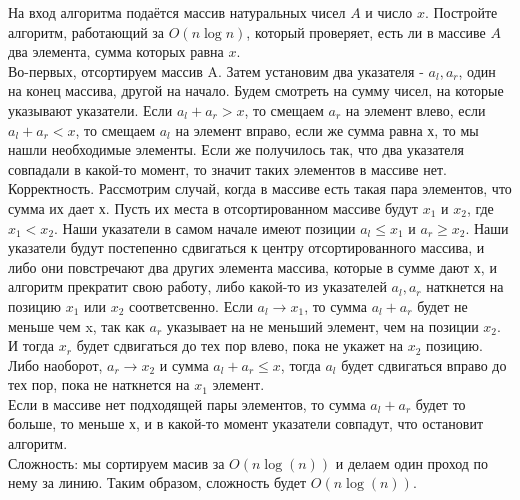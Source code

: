 \documentclass[12pt]{extreport}
\theoremstyle{definiton}
\theoremstyle{definition}
\theoremstyle{definition}
\let\leq\leqslant
\let\geq\geqslant
\begin{document}
\Pr[5] На вход алгоритма подаётся  массив натуральных чисел $A$ и число $x$. Постройте алгоритм, работающий за $O(n\log n)$, который проверяет, есть ли в массиве $A$ два элемента, сумма которых равна $x$.
\newline
\\Во-первых, отсортируем массив A. Затем установим два указателя - $a_l, a_r$, один на конец массива, другой на начало. Будем смотреть на сумму чисел, на которые указывают указатели. Если $a_l + a_r > x$, то смещаем $a_r$ на элемент влево, если $a_l + a_r < x$, то смещаем $a_l$ на элемент вправо, если же сумма равна х, то мы нашли необходимые элементы. Если же получилось так, что два указателя совпадали в какой-то момент, то значит таких элементов в массиве нет.
\\Корректность. Рассмотрим случай, когда в массиве есть такая пара элементов, что сумма их дает х. Пусть их места в отсортированном массиве будут $x_1$ и $x_2$, где $x_1 < x_2$. Наши указатели в самом начале имеют позиции $a_l \leq x_1$ и $a_r \geq x_2$. Наши указатели будут постепенно сдвигаться к центру отсортированного массива, и либо они повстречают два других элемента массива, которые в сумме дают х, и алгоритм прекратит свою работу, либо какой-то из указателей $a_l, a_r$ наткнется на позицию $x_1$ или $x_2$ соответсвенно. Если $a_l \to x_1$, то сумма $a_l + a_r$ будет не меньше чем x, так как $a_r$ указывает на не меньший элемент, чем на позиции $x_2$. И тогда $x_r$ будет сдвигаться до тех пор влево, пока не укажет на $x_2$ позицию. Либо наоборот, $a_r \to x_2$ и сумма $a_l+a_r \leq x$, тогда $a_l$ будет сдвигаться вправо до тех пор, пока не наткнется на $x_1$ элемент. 
\\Если в массиве нет подходящей пары элементов, то сумма $a_l + a_r$ будет то больше, то меньше х, и в какой-то момент указатели совпадут, что остановит алгоритм.
\\Сложность: мы сортируем масив за $O(n\log(n))$ и делаем один проход по нему за линию. Таким образом, сложность будет $O(n\log(n))$.
\end{document}
